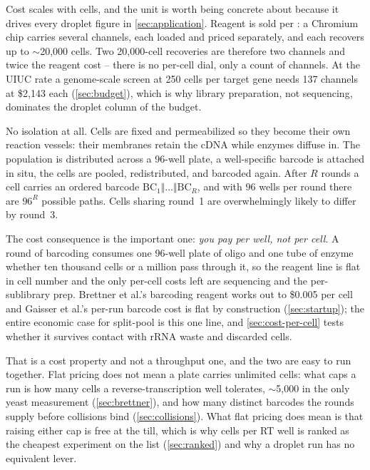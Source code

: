 Cost scales with cells, and the unit is worth being concrete about because it
drives every droplet figure in \cref{sec:application}. Reagent is sold per
: a Chromium chip carries several channels, each loaded and priced
separately, and each recovers up to $\sim$20{,}000 cells. Two 20{,}000-cell
recoveries are therefore two channels and twice the reagent cost -- there is no
per-cell dial, only a count of channels. At the UIUC rate a genome-scale screen
at 250 cells per target gene needs 137 channels at \$2{,}143 each
(\cref{sec:budget}), which is why library preparation, not sequencing, dominates
the droplet column of the budget.

 No isolation at all. Cells are
fixed and permeabilized so they become their own reaction vessels: their
membranes retain the cDNA while enzymes diffuse in. The population is
distributed across a 96-well plate, a well-specific barcode is attached in situ,
the cells are pooled, redistributed, and barcoded again. After $R$ rounds a cell
carries an ordered barcode $\mathrm{BC}_1\Vert\dots\Vert\mathrm{BC}_R$, and with
$96$ wells per round there are $96^R$ possible paths. Cells sharing round~1 are
overwhelmingly likely to differ by round~3.

The cost consequence is the important one: \emph{you pay per well, not per cell}.
A round of barcoding consumes one 96-well plate of oligo and one tube of enzyme
whether ten thousand cells or a million pass through it, so the reagent line is
flat in cell number and the only per-cell costs left are sequencing and the
per-sublibrary prep. Brettner et al.'s barcoding reagent works out to
\$0.005 per cell and Gaisser et al.'s per-run barcode cost is flat by
construction (\cref{sec:startup}); the entire economic case for split-pool is
this one line, and \cref{sec:cost-per-cell} tests whether it survives contact
with rRNA waste and discarded cells.

That is a cost property and not a throughput one, and the two are easy to run
together. Flat pricing does not mean a plate carries unlimited cells: what caps a
run is how many cells a reverse-transcription well tolerates, $\sim$5{,}000 in
the only yeast measurement (\cref{sec:brettner}), and how many distinct barcodes
the rounds supply before collisions bind (\cref{sec:collisions}). What flat
pricing does mean is that raising either cap is free at the till, which is why
cells per RT well is ranked as the cheapest experiment on the list
(\cref{sec:ranked}) and why a droplet run has no equivalent lever.

